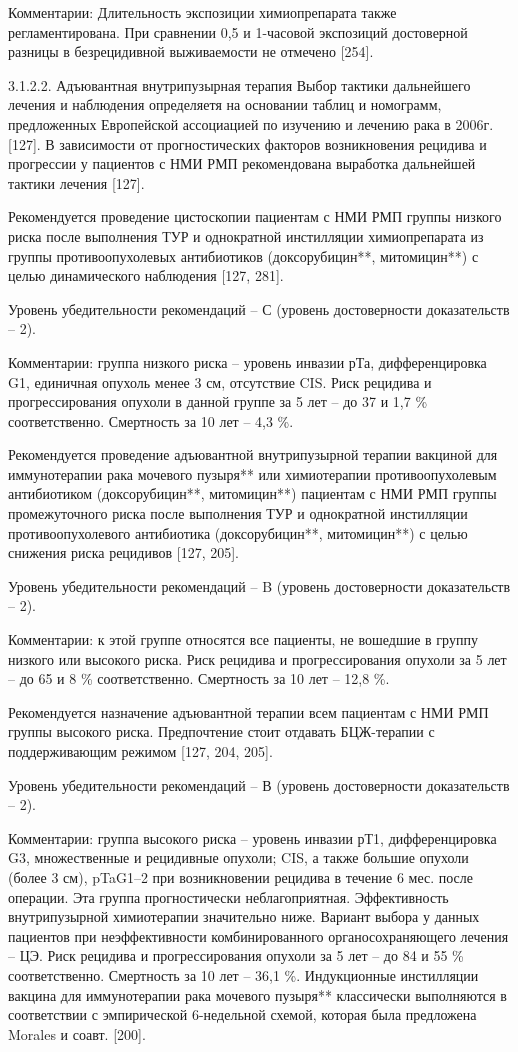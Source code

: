Комментарии: Длительность экспозиции химиопрепарата также регламентирована. При сравнении 0,5 и 1-часовой экспозиций достоверной разницы в безрецидивной выживаемости не отмечено [254].

3.1.2.2. Адъювантная внутрипузырная терапия
Выбор тактики дальнейшего лечения и наблюдения определяетя на основании таблиц и номограмм, предложенных Европейской ассоциацией по изучению и лечению рака в 2006г. [127]. В зависимости от прогностических факторов возникновения рецидива и прогрессии у пациентов с НМИ РМП рекомендована выработка дальнейшей тактики лечения [127].

Рекомендуется проведение цистоскопии пациентам с НМИ РМП группы низкого риска после выполнения ТУР и однократной инстилляции химиопрепарата из группы противоопухолевых антибиотиков (доксорубицин**, митомицин**) с целью динамического наблюдения [127, 281].

Уровень убедительности рекомендаций – С (уровень достоверности доказательств – 2).

Комментарии: группа низкого риска – уровень инвазии рТа, дифференцировка G1, единичная опухоль менее 3 см, отсутствие CIS. Риск рецидива и прогрессирования опухоли в данной группе за 5 лет – до 37 и 1,7 \% соответственно. Смертность за 10 лет – 4,3 \%.

Рекомендуется проведение адъювантной внутрипузырной терапии вакциной для иммунотерапии рака мочевого пузыря** или химиотерапии противоопухолевым антибиотиком (доксорубицин**, митомицин**) пациентам с НМИ РМП группы промежуточного риска после выполнения ТУР и однократной инстилляции противоопухолевого антибиотика (доксорубицин**, митомицин**) с целью снижения риска рецидивов [127, 205].

Уровень убедительности рекомендаций – B (уровень достоверности доказательств – 2).

Комментарии: к этой группе относятся все пациенты, не вошедшие в группу низкого или высокого риска. Риск рецидива и прогрессирования опухоли за 5 лет – до 65 и 8 \% соответственно. Смертность за 10 лет – 12,8 \%.

Рекомендуется назначение адъювантной терапии всем пациентам с НМИ РМП группы высокого риска. Предпочтение стоит отдавать БЦЖ-терапии с поддерживающим режимом [127, 204, 205].

Уровень убедительности рекомендаций – В (уровень достоверности доказательств – 2).

Комментарии: группа высокого риска – уровень инвазии рТ1, дифференцировка G3, множественные и рецидивные опухоли; CIS, а также большие опухоли (более 3 см), pTaG1–2 при возникновении рецидива в течение 6 мес. после операции. Эта группа прогностически неблагоприятная. Эффективность внутрипузырной химиотерапии значительно ниже. Вариант выбора у данных пациентов при неэффективности комбинированного органосохраняющего лечения – ЦЭ. Риск рецидива и прогрессирования опухоли за 5 лет – до 84 и 55 \% соответственно. Смертность за 10 лет – 36,1 \%. Индукционные инстилляции вакцина для иммунотерапии рака мочевого пузыря** классически выполняются в соответствии с эмпирической 6-недельной схемой, которая была предложена Morales и соавт. [200].

